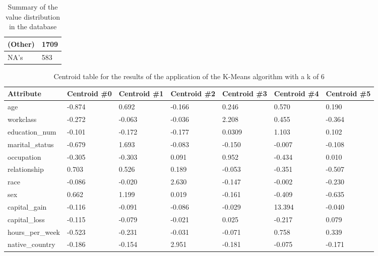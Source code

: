 \documentclass[a4paper]{llncs}
\begin{document}
\begin{table}
{\begin{tabular}{| l | l |}
       \hline
       (Other) & 1709 \\
       \hline
       NA's & 583 \\
       \hline
       \end{tabular}
}
\qquad\qquad
{}
\caption{Summary of the value distribution in the database}
\label{tab:summary}
\end{table}

\begin{table}
\centering
\begin{tabular}{ | l | l | l | l | l | l | l | }
\hline
\textbf{Attribute} & \textbf{Centroid \#0} & \textbf{Centroid \#1} & \textbf{Centroid \#2} & \textbf{Centroid \#3} & \textbf{Centroid \#4} & \textbf{Centroid \#5} \\
\hline
age	& -0.874 & 0.692 & -0.166 & 0.246 & 0.570 & 0.190 \\
\hline
workclass & -0.272 & -0.063 & -0.036 & 2.208 & 0.455 & -0.364 \\
\hline
education\_num & -0.101 & -0.172 & -0.177 & 0.0309 & 1.103 & 0.102 \\
\hline
marital\_status & -0.679 & 1.693 & -0.083 & -0.150 & -0.007 & -0.108 \\
\hline
occupation & -0.305 & -0.303 & 0.091 & 0.952 & -0.434 & 0.010 \\
\hline
relationship & 0.703 & 0.526 & 0.189 & -0.053 & -0.351 & -0.507 \\
\hline
race & -0.086 & -0.020 & 2.630 & -0.147 & -0.002 & -0.230 \\
\hline
sex & 0.662 & 1.199 & 0.019 & -0.161 & -0.409 & -0.635 \\
\hline
capital\_gain & -0.116 & -0.091 & -0.086 & -0.029 & 13.394 & -0.040 \\
\hline
capital\_loss & -0.115 & -0.079 & -0.021 & 0.025 & -0.217 & 0.079 \\
\hline
hours\_per\_week & -0.523 & -0.231 & -0.031 &-0.071 & 0.758 & 0.339 \\
\hline
native\_country & -0.186 & -0.154 & 2.951 & -0.181 & -0.075 & -0.171 \\
\hline
\end{tabular}
\caption{Centroid table for the results of the application of the K-Means algorithm with a k of 6}
\label{tab:centroids}
\end{table}
\end{document}
